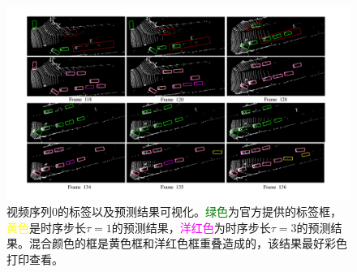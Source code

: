 \begin{figure}[!t]
	\centering
	\includegraphics[trim={2cm, 1cm, 2.5cm, 1cm}, clip, width=\textwidth]{./imgs/examples.pdf}
	\vspace{-1.0cm}
	\caption{视频序列0的标签以及预测结果可视化。\textcolor{green}{绿色}为官方提供的标签框， \textcolor{yellow}{黄色}是时序步长$\tau = 1$的预测结果，\textcolor{magenta}{洋红色}为时序步长$\tau = 3$的预测结果。混合颜色的框是黄色框和洋红色框重叠造成的，该结果最好彩色打印查看。}
	\label{fig:examples}
\end{figure}
